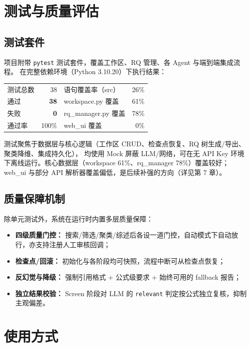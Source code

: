 \documentclass[10pt,a4paper]{article}
\begin{document}
\section{测试与质量评估}

\subsection{测试套件}
项目附带 \texttt{pytest} 测试套件，覆盖工作区、RQ 管理、各 Agent 与端到端集成流程。
在完整依赖环境（Python 3.10.20）下执行结果：

\begin{center}\small
\begin{tabular}{lr|lr}
\toprule
测试总数 & 38 & 语句覆盖率（src） & 26\% \\
通过 & \textbf{38} & workspace.py 覆盖 & 61\% \\
失败 & \textbf{0} & rq\_manager.py 覆盖 & 78\% \\
通过率 & 100\% & web\_ui 覆盖 & 0\% \\
\bottomrule
\end{tabular}
\end{center}

测试聚焦于数据层与核心逻辑（工作区 CRUD、检查点恢复、RQ 树生成/导出、聚类降维、集成持久化），
均使用 Mock 屏蔽 LLM/网络，可在无 API Key 环境下离线运行。核心数据层（workspace 61\%、rq\_manager 78\%）覆盖较好；
web\_ui 与部分 API 解析器覆盖偏低，是后续补强的方向（详见第 7 章）。

\subsection{质量保障机制}
除单元测试外，系统在运行时内置多层质量保障：
\begin{itemize}[leftmargin=2.2em,itemsep=0.05em]
  \item \textbf{四级质量门控：} 搜索/筛选/聚类/综述后各设一道门控，自动模式下自动放行，亦支持注册人工审核回调；
  \item \textbf{检查点/回滚：} 初始化与各阶段均可快照，流程中断可从检查点恢复；
  \item \textbf{反幻觉与降级：} 强制引用格式 + 公式级要求 + 始终可用的 fallback 报告；
  \item \textbf{独立结果校验：} Screen 阶段对 LLM 的 \texttt{relevant} 判定按公式独立复核，抑制主观偏差。
\end{itemize}

\section{使用方式}
\end{document}
